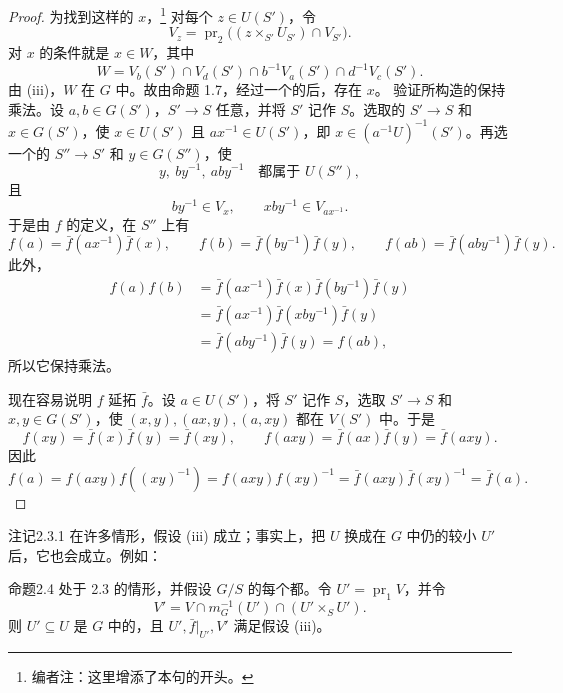 \begin{proof}
为找到这样的 $x$，\footnote{编者注：这里增添了本句的开头。} 对每个 $z\in U(S')$，令
\[
V_z=\operatorname{pr}_2\bigl((z\times_{S'}U_{S'})\cap V_{S'}\bigr).
\]
对 $x$ 的条件就是 $x\in W$，其中
\[
W=V_b(S')\cap V_d(S')\cap b^{-1}V_a(S')\cap d^{-1}V_c(S').
\]
由 (iii)，$W$ 在 $G$ 中。故由命题 1.7，经过一个的后，存在 $x$。
验证所构造的保持乘法。设 $a,b\in G(S')$，$S'\to S$ 任意，并将 $S'$ 记作 $S$。选取的 $S'\to S$ 和 $x\in G(S')$，使 $x\in U(S')$ 且 $ax^{-1}\in U(S')$，即 $x\in(a^{-1}U)^{-1}(S')$。再选一个的 $S''\to S'$ 和 $y\in G(S'')$，使
\[
y,\ by^{-1},\ aby^{-1}\quad\text{都属于 }U(S''),
\]
且
\[
by^{-1}\in V_x,\qquad xby^{-1}\in V_{ax^{-1}}.
\]
于是由 $f$ 的定义，在 $S''$ 上有
\[
f(a)=\bar f(ax^{-1})\bar f(x),\qquad f(b)=\bar f(by^{-1})\bar f(y),\qquad f(ab)=\bar f(aby^{-1})\bar f(y).
\]
此外，
\[
\begin{aligned}
f(a)f(b)&=\bar f(ax^{-1})\bar f(x)\bar f(by^{-1})\bar f(y)\\
&=\bar f(ax^{-1})\bar f(xby^{-1})\bar f(y)\\
&=\bar f(aby^{-1})\bar f(y)=f(ab),
\end{aligned}
\]
所以它保持乘法。

现在容易说明 $f$ 延拓 $\bar f$。设 $a\in U(S')$，将 $S'$ 记作 $S$，选取 $S'\to S$ 和 $x,y\in G(S')$，使 $(x,y),(ax,y),(a,xy)$ 都在 $V(S')$ 中。于是
\[
f(xy)=\bar f(x)\bar f(y)=\bar f(xy),\qquad f(axy)=\bar f(ax)\bar f(y)=\bar f(axy).
\]
因此
\[
f(a)=f(axy)f((xy)^{-1})=f(axy)f(xy)^{-1}=\bar f(axy)\bar f(xy)^{-1}=\bar f(a).
\]
\end{proof}
\begin{SGAresult}{注记}{2.3.1}
在许多情形，假设 (iii) 成立；事实上，把 $U$ 换成在 $G$ 中仍的较小 $U'$ 后，它也会成立。例如：
\end{SGAresult}
\begin{SGAresult}{命题}{2.4}
处于 2.3 的情形，并假设 $G/S$ 的每个都。令 $U'=\operatorname{pr}_1V$，并令
\[
V'=V\cap m_G^{-1}(U')\cap(U'\times_S U').
\]
则 $U'\subseteq U$ 是 $G$ 中的，且 $U',\bar f|_{U'},V'$ 满足假设 (iii)。
\end{SGAresult}
